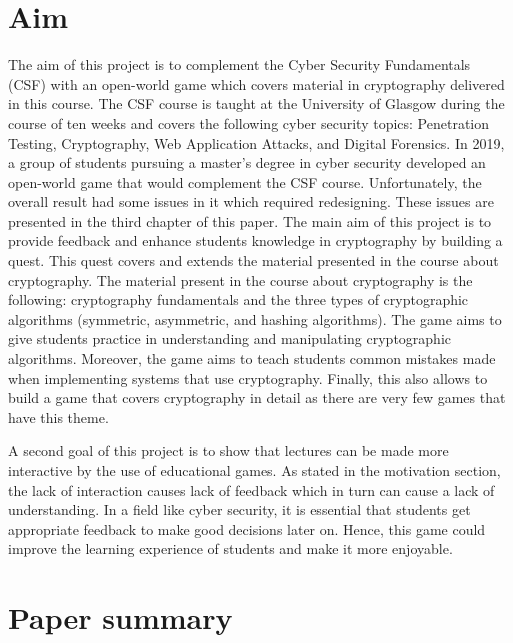 \documentclass{l4proj}
\begin{document}
\section{Aim}

The aim of this project is to complement the Cyber Security Fundamentals (CSF) with an open-world game 
which covers material in cryptography delivered in this course.
The CSF course is taught at the University of Glasgow during the course of ten weeks and covers the following cyber security topics:
Penetration Testing, Cryptography, Web Application Attacks, and Digital Forensics.
In 2019, a group of students pursuing a master's degree in cyber security developed an open-world game 
that would complement the CSF course. 
Unfortunately, the overall result had some issues in it which required redesigning.
These issues are presented in the third chapter of this paper.
The main aim of this project is to provide feedback and enhance students knowledge in cryptography
by building a quest. 
This quest covers and extends the material presented in the course about cryptography.
The material present in the course about cryptography is the following: cryptography fundamentals 
and the three types of cryptographic algorithms (symmetric, asymmetric, and hashing algorithms).
The game aims to give students practice in understanding and manipulating cryptographic algorithms.
Moreover, the game aims to teach students common mistakes made when implementing systems that use cryptography.
Finally, this also allows to build a game that covers cryptography in detail as there are very few games that have this theme.

A second goal of this project is to show that lectures can be made more interactive by the use of educational games.
As stated in the motivation section, the lack of interaction causes lack of feedback which in turn can cause a lack of understanding.
In a field like cyber security, it is essential that students get appropriate feedback to make good decisions later on.
Hence, this game could improve the learning experience of students and make it more enjoyable.

\section{Paper summary}
\end{document}
